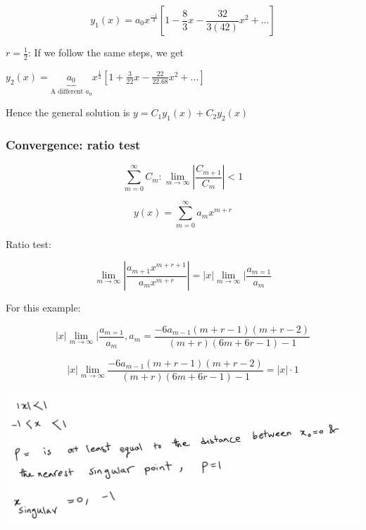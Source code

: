 $$y_1(x) = a_0 x^{\frac{-1}{3}} \left[ 1- \frac{8}{3} x - \frac{32}{3(42)} x^2 + ... \right]$$

$r = \frac{1}{2}$: If we follow the same steps, we get 

$y_2(x) = \underbrace{a_0}_{\text{A different } a_0} x^{\frac{1}{2}} \left[ 1 + \frac{3}{22} x - \frac{22}{22.68}x^2 + ... \right]$

Hence the general solution is $y = C_1 y_1 (x) + C_2 y_2 (x)$

\subsubsection{Convergence: ratio test}

$$\sum_{m = 0}^\infty C_m: \lim_{m \to \infty} | \frac{C_{m+1}}{C_m} | < 1$$

$$y(x) = \sum_{m = 0}^\infty a_m x^{m+r}$$

Ratio test:

$$\lim_{m \to \infty} | \frac{a_{m+1} x^{m+r+1}}{a_m x^{m+r}} | = |x| \lim_{m \to \infty} | \frac{a_{m=1}}{a_m}$$

For this example:

$$ |x| \lim_{m \to \infty} | \frac{a_{m=1}}{a_m}, a_m = \frac{-6 a_{m-1} (m+r-1) (m+r-2)}{(m+r) (6m + 6r - 1) - 1}$$

$$ |x| \lim_{m \to \infty}  \frac{-6 a_{m-1} (m+r-1) (m+r-2)}{(m+r) (6m + 6r - 1) - 1} = |x| \cdot 1$$

\includegraphics[width = 0.95 \textwidth]{image7.png}